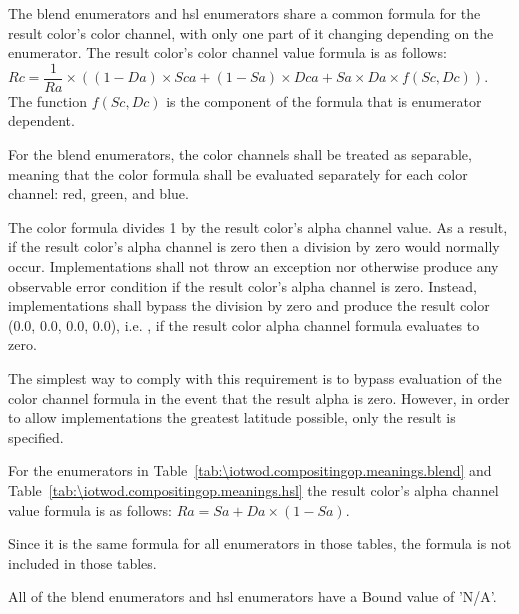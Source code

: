 \pnum
The blend enumerators and hsl enumerators share a common formula for the result 
color's color channel, with only one part of it changing depending on the 
enumerator. The result color's color channel value formula is as follows: $Rc = 
\dfrac{1}{Ra} \times ((1 - Da) \times Sca + (1 - Sa) \times Dca + Sa \times Da 
\times f(Sc, Dc))$. The function $f(Sc, Dc)$ is the component of the formula 
that is enumerator dependent.

\pnum
For the blend enumerators, the color channels shall be treated as separable, 
meaning that the color formula shall be evaluated separately for each color 
channel: red, green, and blue.

\pnum
The color formula divides 1 by the result color's alpha channel value. As a 
result, if the result color's alpha channel is zero then a division by zero 
would normally occur. Implementations shall not throw an exception nor  
otherwise produce any observable error condition if the result color's alpha 
channel is zero. Instead, implementations shall bypass the division by zero and 
produce the result color (0.0, 0.0, 0.0, 0.0), i.e. , if the result color alpha channel formula 
evaluates to zero.
\begin{note}
The simplest way to comply with this requirement is to bypass evaluation of the 
color channel formula in the event that the result alpha is zero. However, in 
order to allow implementations the greatest latitude possible, only the result 
is specified.
\end{note}

\pnum
For the enumerators in 
Table~\ref{tab:\iotwod.compositingop.meanings.blend} and 
Table~\ref{tab:\iotwod.compositingop.meanings.hsl} the result color's 
alpha channel value formula is as follows: $Ra = Sa + Da \times (1 - Sa)$.
\begin{note}
Since it is the same formula for all enumerators in those tables, the formula 
is not included in those tables.
\end{note}

\pnum
All of the blend enumerators and hsl enumerators have a Bound value of 'N/A'.

